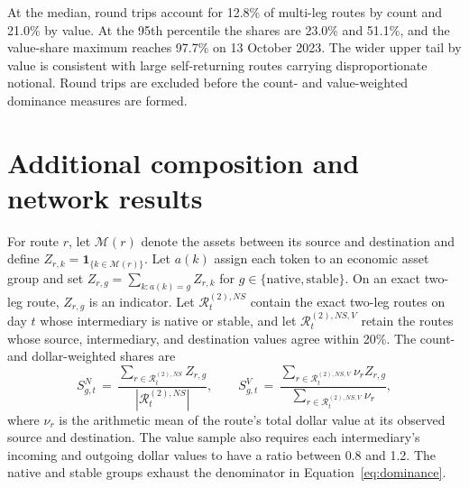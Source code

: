 At the median, round trips account for 12.8\% of multi-leg routes by count and 21.0\% by value. At the 95th percentile the shares are 23.0\% and 51.1\%, and the value-share maximum reaches 97.7\% on 13 October 2023. The wider upper tail by value is consistent with large self-returning routes carrying disproportionate notional. Round trips are excluded before the count- and value-weighted dominance measures are formed.

\section{Additional composition and network results}
\label{app:additional-composition}

For route $r$, let $\mathcal{M}(r)$ denote the assets between its source and destination and define $Z_{r,k}=\mathbf{1}_{\{k\in\mathcal{M}(r)\}}$. Let $a(k)$ assign each token to an economic asset group and set $Z_{r,g}=\sum_{k:a(k)=g}Z_{r,k}$ for $g\in\{\mathrm{native},\mathrm{stable}\}$. On an exact two-leg route, $Z_{r,g}$ is an indicator. Let $\mathcal R^{(2),NS}_t$ contain the exact two-leg routes on day $t$ whose intermediary is native or stable, and let $\mathcal R^{(2),NS,V}_t$ retain the routes whose source, intermediary, and destination values agree within 20\%. The count- and dollar-weighted shares are
\begin{equation}
\label{eq:dominance}
S^{N}_{g,t} \,=\,
\frac{\sum_{r \in \mathcal{R}^{(2),NS}_{t}} Z_{r,g}}
     {|\mathcal{R}^{(2),NS}_{t}|},
\qquad
S^{V}_{g,t} \,=\,
\frac{\sum_{r \in \mathcal{R}^{(2),NS,V}_{t}} \nu_{r} Z_{r,g}}
     {\sum_{r \in \mathcal{R}^{(2),NS,V}_{t}} \nu_{r}},
\end{equation}
where $\nu_r$ is the arithmetic mean of the route's total dollar value at its observed source and destination. The value sample also requires each intermediary's incoming and outgoing dollar values to have a ratio between 0.8 and 1.2. The native and stable groups exhaust the denominator in Equation~\eqref{eq:dominance}.

